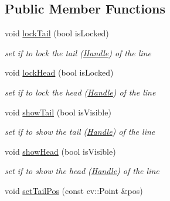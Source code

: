 \subsection*{Public Member Functions}
\begin{DoxyCompactItemize}
\item 
void \hyperlink{classcanvascv_1_1Line_ad58eb26a9f759fcef069ef088eda016a}{lock\+Tail} (bool is\+Locked)\hypertarget{classcanvascv_1_1Line_ad58eb26a9f759fcef069ef088eda016a}{}\label{classcanvascv_1_1Line_ad58eb26a9f759fcef069ef088eda016a}

\begin{DoxyCompactList}\small\item\em set if to lock the tail (\hyperlink{classcanvascv_1_1Handle}{Handle}) of the line \end{DoxyCompactList}\item 
void \hyperlink{classcanvascv_1_1Line_a7ed04307f5469a0f3dbb56843e4def30}{lock\+Head} (bool is\+Locked)\hypertarget{classcanvascv_1_1Line_a7ed04307f5469a0f3dbb56843e4def30}{}\label{classcanvascv_1_1Line_a7ed04307f5469a0f3dbb56843e4def30}

\begin{DoxyCompactList}\small\item\em set if to lock the head (\hyperlink{classcanvascv_1_1Handle}{Handle}) of the line \end{DoxyCompactList}\item 
void \hyperlink{classcanvascv_1_1Line_ad8792291c57126a5ce100cc53c58ad59}{show\+Tail} (bool is\+Visible)\hypertarget{classcanvascv_1_1Line_ad8792291c57126a5ce100cc53c58ad59}{}\label{classcanvascv_1_1Line_ad8792291c57126a5ce100cc53c58ad59}

\begin{DoxyCompactList}\small\item\em set if to show the tail (\hyperlink{classcanvascv_1_1Handle}{Handle}) of the line \end{DoxyCompactList}\item 
void \hyperlink{classcanvascv_1_1Line_a606cc47470a49cb689f9a536d019552e}{show\+Head} (bool is\+Visible)\hypertarget{classcanvascv_1_1Line_a606cc47470a49cb689f9a536d019552e}{}\label{classcanvascv_1_1Line_a606cc47470a49cb689f9a536d019552e}

\begin{DoxyCompactList}\small\item\em set if to show the head (\hyperlink{classcanvascv_1_1Handle}{Handle}) of the line \end{DoxyCompactList}\item 
void \hyperlink{classcanvascv_1_1Line_a51eccef05df0ea69f99ee9eca3f3b12c}{set\+Tail\+Pos} (const cv\+::\+Point \&pos)\hypertarget{classcanvascv_1_1Line_a51eccef05df0ea69f99ee9eca3f3b12c}{}\label{classcanvascv_1_1Line_a51eccef05df0ea69f99ee9eca3f3b12c}


\end{DoxyCompactItemize}
